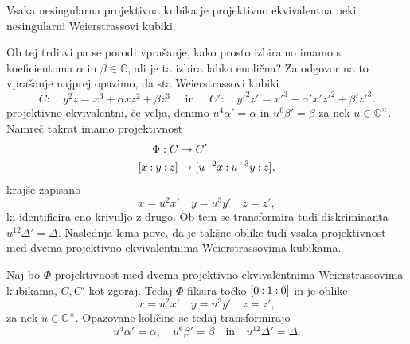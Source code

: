 \documentclass[mat1]{fmfdelo}
\newcommand{\C}{\mathbb C}
\newcommand{\CM}{\mathbb C ^\times}
\newcommand{\pcoor}[1]{%
  \begingroup\lccode`~=`: \lowercase{\endgroup
  \edef~}{\mathbin{\mathchar\the\mathcode`:}\nobreak}%
  [%
  \begingroup
  \mathcode`:=\string"8000
  #1%
  \endgroup
  ]%
}
\theoremstyle{definition}
\begin{document}
\begin{trditev}
    \label{kubika izomorfna neki wnf}
    Vsaka nesingularna projektivna kubika je projektivno ekvivalentna neki nesingularni Weierstrassovi kubiki.  
\end{trditev}

\begin{dokaz}
    \cite[lemma 15.2]{Gibson}
\end{dokaz}

Ob tej trditvi pa se porodi vprašanje, kako prosto izbiramo imamo s koeficientoma $\alpha$ in $\beta \in \C$, ali je ta izbira lahko enolična? Za odgovor na to vprašanje najprej opazimo, da sta Weierstrassovi kubiki 
\[
    C: \quad y^2z = x^3 + \alpha xz^2 + \beta z^3 \quad \text{ in } \quad
    C': \quad y'^2z' = x'^3 + \alpha' x'z'^2 + \beta' z'^3. 
\]
projektivno ekvivalentni, če velja, denimo $u^4 \alpha' = \alpha$ in $u^6 \beta' = \beta$ za nek $u \in \CM$. Namreč takrat imamo projektivnost
\begin{align*}
    \Phi:C &\to C'\\
    \pcoor{x : y : z} &\mapsto \pcoor{u^{-2}x : u^{-3}y : z},
\end{align*}
krajše zapisano 
\[
    x = u^2 x' \quad y = u^3 y' \quad z = z',  
\]
ki identificira eno krivuljo z drugo. Ob tem se transformira tudi diskriminanta $u^{12} \Delta' = \Delta$. Naslednja lema pove, da je takšne oblike tudi vsaka projektivnost med dvema projektivno ekvivalentnima Weierstrassovima kubikama. 
        
\begin{lema}
    \label{projektivnosti wnf}
    Naj bo $\Phi$ projektivnost med dvema projektivno ekvivalentnima Weierstrassovima kubikama, $C, C'$ kot zgoraj. Tedaj $\Phi$ fiksira točko $\pcoor{0 : 1 : 0}$ in je oblike 
    \begin{equation}
        \label{eq:transformacija wnf}
        x = u^2 x' \quad y = u^3 y' \quad z = z',  
    \end{equation}
    za nek $u \in \CM$. Opazovane količine se tedaj transformirajo 
    \[
        u^4 \alpha' = \alpha, \quad u^6 \beta' = \beta \quad \text{in} \quad u^{12} \Delta' = \Delta.
    \]
\end{lema}
\end{document}

